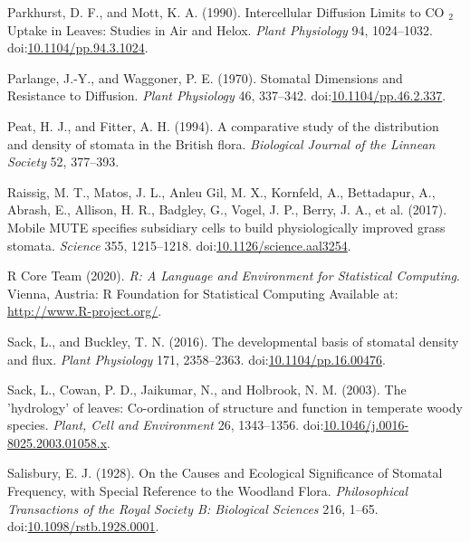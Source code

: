 \documentclass[utf8]{frontiersSCNS}
\newlength{\cslhangindent}
\newenvironment{cslreferences}%
  {\setlength{\parindent}{0pt}%
  \everypar{\setlength{\hangindent}{\cslhangindent}}\ignorespaces}%
  {\par}
\begin{document}
\begin{cslreferences}
\leavevmode\hypertarget{ref-parkhurst_intercellular_1990}{}%
Parkhurst, D. F., and Mott, K. A. (1990). Intercellular Diffusion Limits
to CO \(_{\textrm{2}}\) Uptake in Leaves: Studies in Air and Helox.
\emph{Plant Physiology} 94, 1024--1032.
doi:\href{https://doi.org/10.1104/pp.94.3.1024}{10.1104/pp.94.3.1024}.

\leavevmode\hypertarget{ref-parlange_stomatal_1970}{}%
Parlange, J.-Y., and Waggoner, P. E. (1970). Stomatal Dimensions and
Resistance to Diffusion. \emph{Plant Physiology} 46, 337--342.
doi:\href{https://doi.org/10.1104/pp.46.2.337}{10.1104/pp.46.2.337}.

\leavevmode\hypertarget{ref-peat_comparative_1994}{}%
Peat, H. J., and Fitter, A. H. (1994). A comparative study of the
distribution and density of stomata in the British flora.
\emph{Biological Journal of the Linnean Society} 52, 377--393.

\leavevmode\hypertarget{ref-raissig_mobile_2017}{}%
Raissig, M. T., Matos, J. L., Anleu Gil, M. X., Kornfeld, A.,
Bettadapur, A., Abrash, E., Allison, H. R., Badgley, G., Vogel, J. P.,
Berry, J. A., et al. (2017). Mobile MUTE specifies subsidiary cells to
build physiologically improved grass stomata. \emph{Science} 355,
1215--1218.
doi:\href{https://doi.org/10.1126/science.aal3254}{10.1126/science.aal3254}.

\leavevmode\hypertarget{ref-r_core_team_r:_2020}{}%
R Core Team (2020). \emph{R: A Language and Environment for Statistical
Computing}. Vienna, Austria: R Foundation for Statistical Computing
Available at: \url{http://www.R-project.org/}.

\leavevmode\hypertarget{ref-sack_developmental_2016}{}%
Sack, L., and Buckley, T. N. (2016). The developmental basis of stomatal
density and flux. \emph{Plant Physiology} 171, 2358--2363.
doi:\href{https://doi.org/10.1104/pp.16.00476}{10.1104/pp.16.00476}.

\leavevmode\hypertarget{ref-sack_hydrology_2003}{}%
Sack, L., Cowan, P. D., Jaikumar, N., and Holbrook, N. M. (2003). The
'hydrology' of leaves: Co-ordination of structure and function in
temperate woody species. \emph{Plant, Cell and Environment} 26,
1343--1356.
doi:\href{https://doi.org/10.1046/j.0016-8025.2003.01058.x}{10.1046/j.0016-8025.2003.01058.x}.

\leavevmode\hypertarget{ref-salisbury_causes_1928}{}%
Salisbury, E. J. (1928). On the Causes and Ecological Significance of
Stomatal Frequency, with Special Reference to the Woodland Flora.
\emph{Philosophical Transactions of the Royal Society B: Biological
Sciences} 216, 1--65.
doi:\href{https://doi.org/10.1098/rstb.1928.0001}{10.1098/rstb.1928.0001}.


\end{cslreferences}
\end{document}
